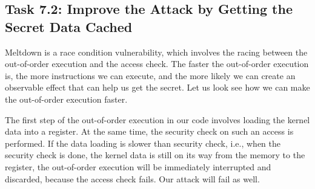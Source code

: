 %
%
%
%
%
%
%




\subsection{Task 7.2: Improve the Attack by Getting the Secret Data Cached}


Meltdown is a race condition vulnerability, which involves the racing between the out-of-order
execution and the access check. The faster the out-of-order execution is, the more instructions we 
can execute, and the more likely we can create an observable effect that can help us get the
secret. Let us look see how we can make the out-of-order execution faster. 

The first step of the out-of-order execution in our code involves loading the kernel data into 
a register. At the same time, the security check on such an access is performed.  
If the data loading is slower than security check, i.e., when the security check is done, 
the kernel data is still on its way from the memory to the register, the out-of-order execution
will be immediately interrupted and discarded, because the access check fails. Our attack will fail
as well. 

